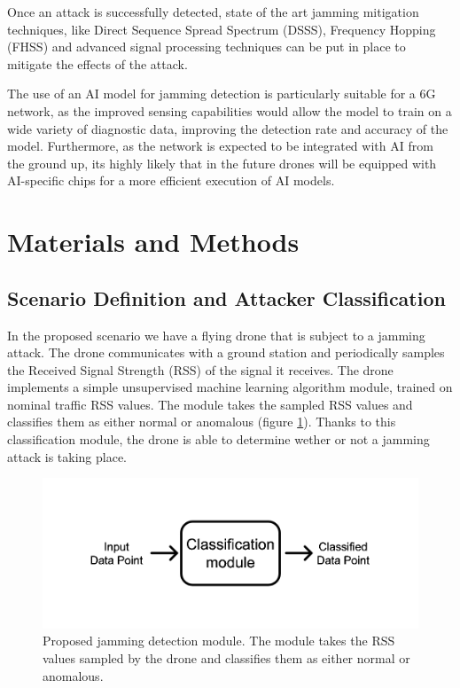\documentclass[futureinternet,article,submit,pdftex,moreauthors]{Definitions/mdpi}
\begin{document}
Once an attack is successfully detected, state of the art jamming mitigation techniques, like Direct Sequence Spread Spectrum (DSSS), Frequency Hopping (FHSS) and advanced signal processing techniques can be put in place to mitigate the 
effects of the attack. 

The use of an AI model for jamming detection is particularly suitable for a 6G network, as the improved sensing capabilities would allow the model to train on a wide variety of diagnostic data, improving the detection rate and accuracy of the model. 
Furthermore, as the network is expected to be integrated with AI from the ground up, its highly likely that in the future drones will be equipped with AI-specific chips for a more efficient execution of AI models.

\section{Materials and Methods}

\subsection{Scenario Definition and Attacker Classification}

In the proposed scenario we have a flying drone that is subject to a jamming attack. The drone communicates with a ground station and periodically samples the Received Signal Strength (RSS) of the signal it receives. 
The drone implements a simple unsupervised machine learning algorithm module, trained on nominal traffic RSS values. The module takes the sampled RSS values and classifies them as either normal or anomalous (figure \ref{fig:moduleStructure}). Thanks to this classification module, the drone is able to determine wether or not a jamming attack is taking place. 

\begin{figure}[H]
	\includegraphics[width=10.5 cm]{img/Simple module.jpg}
	\caption{Proposed jamming detection module. The module takes the RSS values sampled by the drone and classifies them as either normal or anomalous.}
	\label{fig:moduleStructure}
\end{figure}   
\unskip
\end{document}
